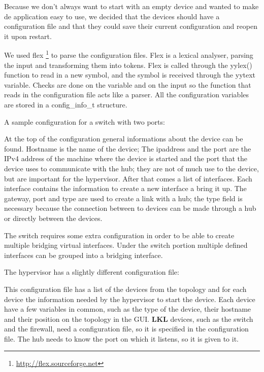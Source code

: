 Because we don't always want to start with an empty device and wanted to make de application easy to use, we decided that the
devices should have a configuration file and that they could save their current configuration and reopen it upon restart. 

We used flex \footnote{\url{http://flex.sourceforge.net}} to parse the configuration files. Flex is a lexical analyser, 
parsing the input and transforming them into tokens. Flex is called through the yylex() function to read in a new symbol, and the
symbol is received through the yytext variable. Checks are done on the variable and on the input so the function that reads in 
the configuration file acts like a parser. All the configuration variables are stored in a config_info_t structure.

A sample configuration for a switch with two ports:
\lstset{language=inform,caption=Example switch configuration file,label=lst:dconf}


At the top of the configuration general informations about the device can be found. Hostname is the name of the device;
The ipaddress and the port are the IPv4 address of the machine where the device is started and the port that the device
uses to communicate with the hub; they are not of much use to the device, but are important for the hypervisor.
After that comes a list of interfaces.	Each interface contains the information to create a new interface a bring it up.
The gateway, port and type are used to create a link with a hub; the type field is necessary because the connection between
to devices can be made through a hub or directly between the devices. 

The switch requires some extra configuration in order to be able to create multiple bridging virtual interfaces. 
Under the switch portion multiple defined interfaces can be grouped into a bridging interface.

The hypervisor has a slightly different configuration file:
\lstset{language=inform,caption=Example hypervisor configuration file,label=lst:hconf}

This configuration file has a list of the devices from the topology and for each device the information needed by the hypervisor to
start the device. Each device have a few variables in common, such as the type of the device, their hostname and their position on
the topology in the GUI. \textbf{LKL} devices, such as the switch and the firewall, need a configuration file, so it is specified in the
configuration file. The hub needs to know the port on which it listens, so it is given to it.

